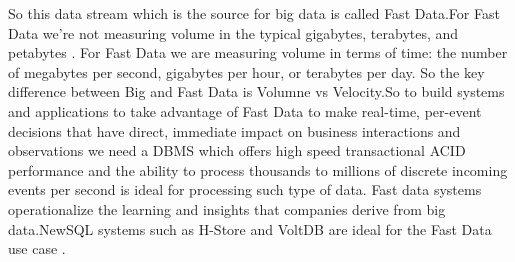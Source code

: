 \documentclass[9pt,twocolumn,twoside]{../../styles/osajnl}
\begin{document}
So this data stream which is the source for big data is called Fast Data.For Fast Data we're not measuring volume in the typical gigabytes, terabytes, and petabytes . For Fast Data we are measuring volume in terms of time: the number of megabytes per second, gigabytes per hour, or terabytes per day. So the key difference between Big and Fast Data is Volumne vs Velocity.So to build systems and applications to take advantage of Fast Data  to make real-time, per-event decisions that have direct, immediate impact on business interactions and observations we need a DBMS which  offers high speed transactional ACID performance and the ability to process thousands to millions of discrete incoming events per second is ideal for processing such type of data. Fast data systems operationalize the learning and insights that companies derive from big data.NewSQL systems such as H-Store and VoltDB are ideal for the Fast Data use case \cite{www-FastData}.
\end{document}
